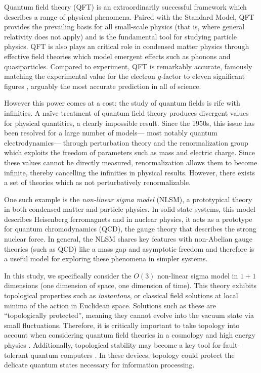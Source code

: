 Quantum field theory (QFT) is an extraordinarily successful framework which describes a range of physical phenomena. Paired with the Standard Model, QFT provides the prevailing basis for all small-scale physics (that is, where general relativity does not apply) and is the fundamental tool for studying particle physics. QFT is also plays an critical role in condensed matter physics through effective field theories which model emergent effects such as phonons and quasiparticles. Compared to experiment, QFT is remarkably accurate, famously matching the experimental value for the electron $g$-factor to eleven significant figures \cite{odom2006}, arguably the most accurate prediction in all of science.

However this power comes at a cost: the study of quantum fields is rife with infinities. A na\"ive treatment of quantum field theory produces divergent values for physical quantities, a clearly impossible result. Since the 1950s, this issue has been resolved for a large number of models--- most notably quantum electrodynamics--- through perturbation theory and the renormalization group which exploits the freedom of parameters such as mass and electric charge. Since these values cannot be directly measured, renormalization allows them to become infinite, thereby cancelling the infinities in physical results. However, there exists a set of theories which as not perturbatively renormalizable.

One such example is the \textit{non-linear sigma model} (NLSM), a prototypical theory in both condensed matter and particle physics. In solid-state systems, this model describes Heisenberg ferromagnets \cite{callan1985} and in nuclear physics, it acts as a prototype for quantum chromodynamics (QCD), the gauge theory that describes the strong nuclear force. In general, the NLSM shares key features with non-Abelian gauge theories (such as QCD) like a mass gap and asymptotic freedom \cite{polyakov1975} and therefore is a useful model for exploring these phenomena in simpler systems.

In this study, we specifically consider the $O(3)$ non-linear sigma model in $1+1$ dimensions (one dimension of space, one dimension of time). This theory exhibits topological properties such as \textit{instantons}, or classical field solutions at local minima of the action in Euclidean space. Solutions such as these are ``topologically protected'', meaning they cannot evolve into the vacuum state via small fluctuations. Therefore, it is critically important to take topology into account when considering quantum field theories in a cosmology and high energy physics \cite{goddard1986}. Additionally, topological stability may become a key tool for fault-tolerant quantum computers \cite{kitaev1997}. In these devices, topology could protect the delicate quantum states necessary for information processing.

